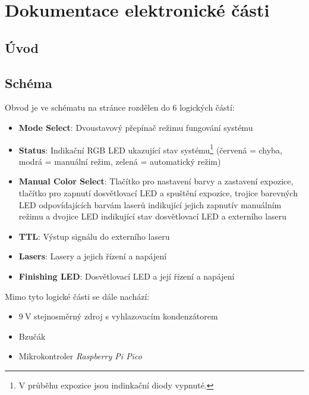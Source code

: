 \documentclass[twoside,project,skipblank]{../MFFPrace}
\begin{document}
\maketitle
\begingroup
\let\clearpage\relax
\tableofcontents
\listoffigures
\listoftables
\endgroup
\appendix
\setcounter{chapter}{2}
\chapter{Dokumentace elektronické části}

\section{Úvod}

\section{Schéma}
Obvod je ve schématu na stránce \pageref{fig:schema} rozdělen do 6 logických částí:
\begin{itemize}
    \item \textbf{\textsf{Mode Select}}: Dvoustavový přepínač režimu fungování systému
    \item \textbf{\textsf{Status}}: Indikační RGB LED ukazující stav systému\footnote[1]{V průběhu expozice jsou indinkační diody vypnuté.} (červená = chyba, modrá = manuální režim, zelená = automatický režim)
    \item \textbf{\textsf{Manual Color Select}}: Tlačítko pro nastavení barvy a zastavení expozice, tlačítko pro zapnutí dosvětlovací LED a spuštění expozice, trojice barevných LED odpovídajících barvám laserů indikující jejich zapnutí\footnotemark[1] v manuálním režimu a dvojice LED indikující stav dosvětlovací LED a externího laseru\footnotemark[1]
    \item \textbf{\textsf{TTL}}: Výstup signálu do externího laseru
    \item \textbf{\textsf{Lasers}}: Lasery a jejich řízení a napájení
    \item \textbf{\textsf{Finishing LED}}: Dosvětlovací LED a její řízení a napájení
\end{itemize}
Mimo tyto logické části se dále nachází:
\begin{itemize}
    \item $9\:\text{V}$ stejnosměrný zdroj s vyhlazovacím kondenzátorem
    \item Bzučák
    \item Mikrokontroler \textit{Raspberry Pi Pico}
\end{itemize}
\end{document}

